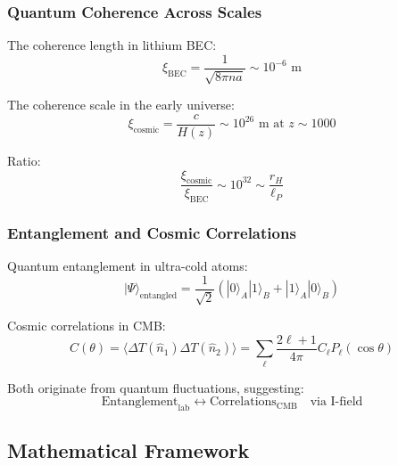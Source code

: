 \subsubsection{Quantum Coherence Across Scales}

The coherence length in lithium BEC:
\begin{equation}
\label{eq:bec_coherence}
\xi_{\text{BEC}} = \frac{1}{\sqrt{8\pi n a}} \sim 10^{-6} \text{ m}
\end{equation}

The coherence scale in the early universe:
\begin{equation}
\label{eq:cosmic_coherence}
\xi_{\text{cosmic}} = \frac{c}{H(z)} \sim 10^{26} \text{ m at } z \sim 1000
\end{equation}

Ratio:
\begin{equation}
\label{eq:coherence_ratio}
\frac{\xi_{\text{cosmic}}}{\xi_{\text{BEC}}} \sim 10^{32} \sim \frac{r_H}{\ell_P}
\end{equation}

\subsubsection{Entanglement and Cosmic Correlations}

Quantum entanglement in ultra-cold atoms:
\begin{equation}
\label{eq:atomic_entanglement}
|\Psi\rangle_{\text{entangled}} = \frac{1}{\sqrt{2}}(|0\rangle_A|1\rangle_B + |1\rangle_A|0\rangle_B)
\end{equation}

Cosmic correlations in CMB:
\begin{equation}
\label{eq:cmb_correlations}
C(\theta) = \langle \Delta T(\hat{n}_1) \Delta T(\hat{n}_2) \rangle = \sum_\ell \frac{2\ell+1}{4\pi} C_\ell P_\ell(\cos\theta)
\end{equation}

Both originate from quantum fluctuations, suggesting:
\begin{equation}
\label{eq:quantum_origin}
\text{Entanglement}_{\text{lab}} \longleftrightarrow \text{Correlations}_{\text{CMB}} \quad \text{via I-field}
\end{equation}

\subsection{Mathematical Framework}

